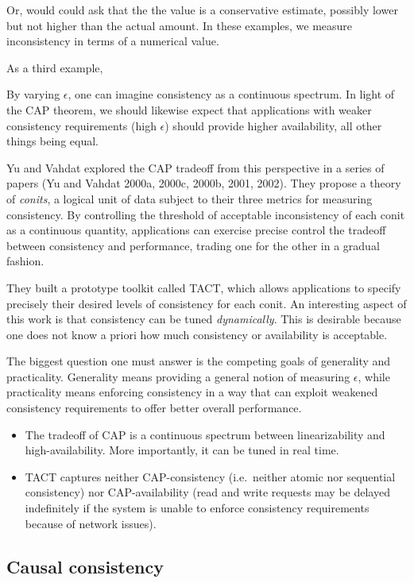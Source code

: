 \documentclass[]             %
{NASA}                       %
\theoremstyle{definition}
\begin{document}
Or, would could ask that the the value is a conservative estimate,
possibly lower but not higher than the actual amount. In these examples,
we measure inconsistency in terms of a numerical value.

As a third example,

By varying \(\epsilon\), one can imagine consistency as a continuous
spectrum. In light of the CAP theorem, we should likewise expect that
applications with weaker consistency requirements (high \(\epsilon\))
should provide higher availability, all other things being equal.

Yu and Vahdat explored the CAP tradeoff from this perspective in a
series of papers (Yu and Vahdat 2000a, 2000c, 2000b, 2001, 2002). They
propose a theory of \emph{conits}, a logical unit of data subject to
their three metrics for measuring consistency. By controlling the
threshold of acceptable inconsistency of each conit as a continuous
quantity, applications can exercise precise control the tradeoff between
consistency and performance, trading one for the other in a gradual
fashion.

They built a prototype toolkit called TACT, which allows applications to
specify precisely their desired levels of consistency for each conit. An
interesting aspect of this work is that consistency can be tuned
\emph{dynamically}. This is desirable because one does not know a priori
how much consistency or availability is acceptable.

The biggest question one must answer is the competing goals of
generality and practicality. Generality means providing a general notion
of measuring \(\epsilon\), while practicality means enforcing
consistency in a way that can exploit weakened consistency requirements
to offer better overall performance.

\begin{itemize}
\item
  The tradeoff of CAP is a continuous spectrum between linearizability
  and high-availability. More importantly, it can be tuned in real time.
\item
  TACT captures neither CAP-consistency (i.e.~neither atomic nor
  sequential consistency) nor CAP-availability (read and write requests
  may be delayed indefinitely if the system is unable to enforce
  consistency requirements because of network issues).
\end{itemize}

\hypertarget{causal-consistency-1}{%
\subsection{Causal consistency}\label{causal-consistency-1}}
\end{document}
